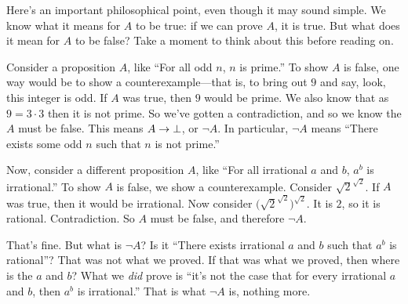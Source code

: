 \documentclass[11pt,paper=letter]{scrartcl}
\renewcommand{\lnot}{\neg}
\begin{document}
Here's an important philosophical point, even though it may sound simple. We know what it means for $A$ to be true: if we can prove $A$, it is true. But what does it mean for $A$ to be false? Take a moment to think about this before reading on.

Consider a proposition $A$, like ``For all odd $n$, $n$ is prime.'' To show $A$ is false, one way would be to show a counterexample---that is, to bring out $9$ and say, look, this integer is odd. If $A$ was true, then $9$ would be prime. We also know that as $9 = 3 \cdot 3$ then it is not prime. So we've gotten a contradiction, and so we know the $A$ must be false. This means $A \to \bot$, or $\lnot A$. In particular, $\lnot A$ means ``There exists some odd $n$ such that $n$ is not prime.''

Now, consider a different proposition $A$, like ``For all irrational $a$ and $b$, $a^b$ is irrational.'' To show $A$ is false, we show a counterexample. Consider $\sqrt{2}^{\sqrt{2}}$. If $A$ was true, then it would be irrational. Now consider $\Big(\sqrt{2}^{\sqrt{2}}\Big)^{\sqrt{2}}$. It is $2$, so it is rational. Contradiction. So $A$ must be false, and therefore $\lnot A$.

That's fine. But what is $\lnot A$? Is it ``There exists irrational $a$ and $b$ such that $a^b$ is rational''? That was not what we proved. If that was what we proved, then where is the $a$ and $b$? What we \emph{did} prove is ``it's not the case that for every irrational $a$ and $b$, then $a^b$ is irrational.'' That is what $\lnot A$ is, nothing more.


\end{document}
